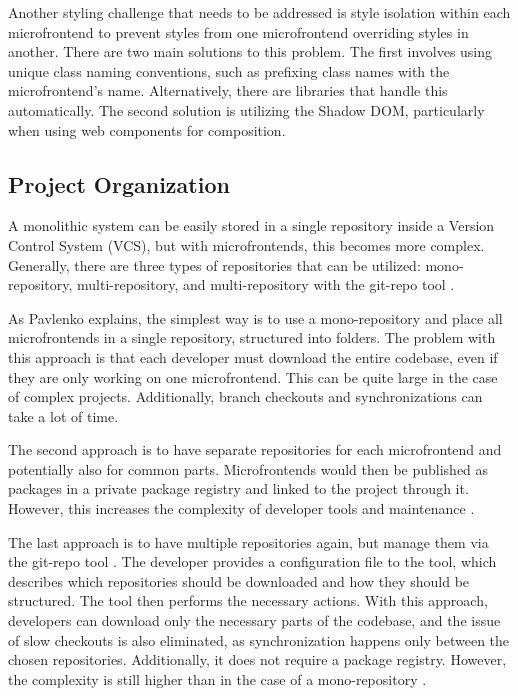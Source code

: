 Another styling challenge that needs to be addressed is style isolation within each microfrontend to prevent styles from one microfrontend overriding styles in another. There are two main solutions to this problem. The first involves using unique class naming conventions, such as prefixing class names with the microfrontend's name. Alternatively, there are libraries that handle this automatically. The second solution is utilizing the Shadow DOM, particularly when using web components for composition.

\subsection{Project Organization}
A monolithic system can be easily stored in a single repository inside a Version Control System (VCS), but with microfrontends, this becomes more complex. Generally, there are three types of repositories that can be utilized: mono-repository, multi-repository, and multi-repository with the git-repo tool \cite{Pavlenko}.

As Pavlenko \cite{Pavlenko} explains, the simplest way is to use a mono-repository and place all microfrontends in a single repository, structured into folders. The problem with this approach is that each developer must download the entire codebase, even if they are only working on one microfrontend. This can be quite large in the case of complex projects. Additionally, branch checkouts and synchronizations can take a lot of time.

The second approach is to have separate repositories for each microfrontend and potentially also for common parts. Microfrontends would then be published as packages in a private package registry and linked to the project through it. However, this increases the complexity of developer tools and maintenance \cite{Pavlenko}.

The last approach is to have multiple repositories again, but manage them via the git-repo tool \cite{GitRepo}. The developer provides a configuration file to the tool, which describes which repositories should be downloaded and how they should be structured. The tool then performs the necessary actions. With this approach, developers can download only the necessary parts of the codebase, and the issue of slow checkouts is also eliminated, as synchronization happens only between the chosen repositories. Additionally, it does not require a package registry. However, the complexity is still higher than in the case of a mono-repository \cite{Pavlenko}.